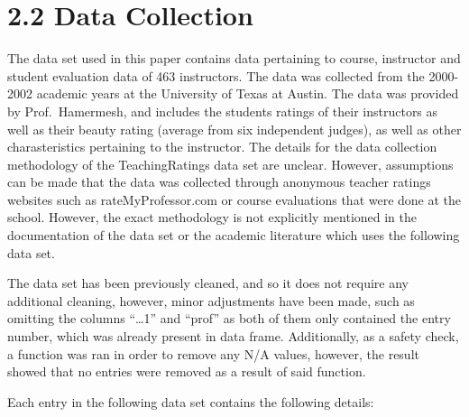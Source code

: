 \documentclass[
  letterpaper,
  DIV=11,
  numbers=noendperiod]{scrartcl}
\begin{document}
\hypertarget{data-collection}{%
\section{2.2 Data Collection}\label{data-collection}}

The data set used in this paper contains data pertaining to course,
instructor and student evaluation data of 463 instructors. The data was
collected from the 2000-2002 academic years at the University of Texas
at Austin. The data was provided by Prof.~Hamermesh, and includes the
students ratings of their instructors as well as their beauty rating
(average from six independent judges), as well as other charasteristics
pertaining to the instructor. The details for the data collection
methodology of the TeachingRatings data set are unclear. However,
assumptions can be made that the data was collected through anonymous
teacher ratings websites such as rateMyProfessor.com or course
evaluations that were done at the school. However, the exact methodology
is not explicitly mentioned in the documentation of the data set or the
academic literature which uses the following data set.

The data set has been previously cleaned, and so it does not require any
additional cleaning, however, minor adjustments have been made, such as
omitting the columns ``\ldots1'' and ``prof'' as both of them only
contained the entry number, which was already present in data frame.
Additionally, as a safety check, a function was ran in order to remove
any N/A values, however, the result showed that no entries were removed
as a result of said function.

Each entry in the following data set contains the following details:
\end{document}
